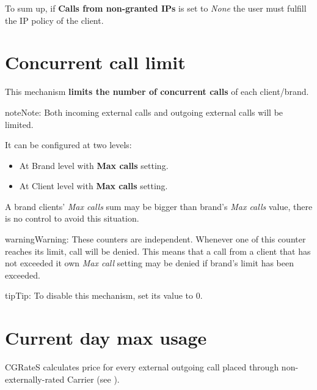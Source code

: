 \documentclass[letterpaper,10pt,english]{sphinxmanual}
\begin{document}
To sum up, if \textbf{Calls from non-granted IPs} is set to \emph{None} the user must fulfill the IP policy of the client.


\section{Concurrent call limit}
\label{security_and_maintenance/security/concurrent_call_limit::doc}\label{security_and_maintenance/security/concurrent_call_limit:concurrent-call-limit}
This mechanism \textbf{limits the number of concurrent calls} of each client/brand.

\begin{notice}{note}{Note:}
Both incoming external calls and outgoing external calls will be limited.
\end{notice}

It can be configured at two levels:
\begin{itemize}
\item {} 
At Brand level with \textbf{Max calls} setting.

\item {} 
At Client level with \textbf{Max calls} setting.

\end{itemize}

A brand clients' \emph{Max calls} sum may be bigger than brand's \emph{Max calls} value, there is no control to avoid this situation.

\begin{notice}{warning}{Warning:}
These counters are independent. Whenever one of this counter reaches its limit, call will be denied. This
means that a call from a client that has not exceeded it own \emph{Max call} setting may be denied if brand's
limit has been exceeded.
\end{notice}

\begin{notice}{tip}{Tip:}
To disable this mechanism, set its value to 0.
\end{notice}


\section{Current day max usage}
\label{security_and_maintenance/security/current_day_max_usage:current-day-max-usage}\label{security_and_maintenance/security/current_day_max_usage::doc}
CGRateS calculates price for every external outgoing call placed through non-externally-rated Carrier (see {\hyperref[administration_portal/brand/billing/index:billing]{}}).
\end{document}
